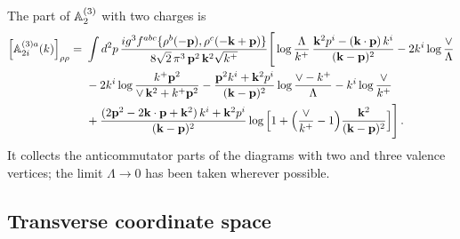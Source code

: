 The part of $\mathbb{A}^{(3)}_2$ with two charges is
\begin{align}\label{eq:A3tworho}
\Big[\mathbb{A}^{(3)a}_{2i}(k)\Big]_{\rho\rho}=\ &\int d^2p\,\frac{ig^3f^{abc}\{\rho^b(-\mathbf{p}),\rho^c(-\mathbf{k}+\mathbf{p})\}}{8\sqrt2\,\pi^3\,\mathbf{p}^2\,\mathbf{k}^2\sqrt{k^+}}
\Bigg[\log\frac{\Lambda}{k^+}\,\frac{\mathbf{k}^2p^i-(\mathbf{k}\cdot\mathbf{p})\,k^i}{(\mathbf{k}-\mathbf{p})^2}
-2k^i\log\frac{\vee}{\Lambda}
\notag\\&
-2k^i\log\frac{k^+\mathbf{p}^2}{\vee\,\mathbf{k}^2+k^+\mathbf{p}^2}
-\frac{\mathbf{p}^2k^i+\mathbf{k}^2p^i}{(\mathbf{k}-\mathbf{p})^2}\log\frac{\vee-k^+}{\Lambda}-k^i\log\frac{\vee}{k^+}
\notag\\&
+\frac{(2\mathbf{p}^2-2\mathbf{k}\cdot\mathbf{p}+\mathbf{k}^2)\,k^i+\mathbf{k}^2p^i}{(\mathbf{k}-\mathbf{p})^2}\log\Big[1+\Big(\frac{\vee}{k^+}-1\Big)\frac{\mathbf{k}^2}{(\mathbf{k}-\mathbf{p})^2}\Big]\Bigg]\,.
\end{align}
It collects the anticommutator parts of the diagrams with two and three valence vertices; the limit $\Lambda\to0$ has been taken wherever possible.

\subsection{Transverse coordinate space}

